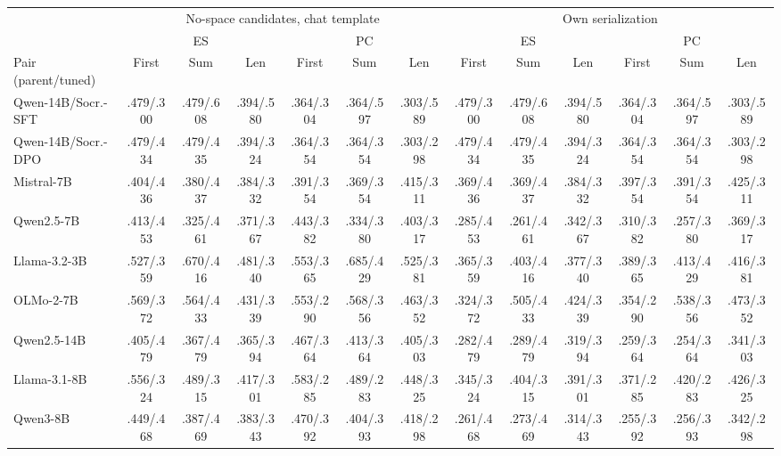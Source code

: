 \begin{table}[t]
\centering\scriptsize
\setlength{\tabcolsep}{2.0pt}
\begin{tabular}{@{}lccc@{\hspace{8pt}}ccc@{\hspace{8pt}}ccc@{\hspace{8pt}}ccc@{}}
\toprule
& \multicolumn{6}{c}{No-space candidates, chat template} & \multicolumn{6}{c}{Own serialization} \\
\cmidrule(lr){2-7}\cmidrule(l){8-13}
& \multicolumn{3}{c}{ES} & \multicolumn{3}{c}{PC} & \multicolumn{3}{c}{ES} & \multicolumn{3}{c}{PC} \\
\cmidrule(lr){2-4}\cmidrule(lr){5-7}\cmidrule(lr){8-10}\cmidrule(l){11-13}
Pair (parent/tuned) & First & Sum & Len & First & Sum & Len & First & Sum & Len & First & Sum & Len \\
\midrule
Qwen-14B/Socr.-SFT & .479/.300 & .479/.608 & .394/.580 & .364/.304 & .364/.597 & .303/.589 & .479/.300 & .479/.608 & .394/.580 & .364/.304 & .364/.597 & .303/.589 \\
Qwen-14B/Socr.-DPO & .479/.434 & .479/.435 & .394/.324 & .364/.354 & .364/.354 & .303/.298 & .479/.434 & .479/.435 & .394/.324 & .364/.354 & .364/.354 & .303/.298 \\
Mistral-7B & .404/.436 & .380/.437 & .384/.332 & .391/.354 & .369/.354 & .415/.311 & .369/.436 & .369/.437 & .384/.332 & .397/.354 & .391/.354 & .425/.311 \\
Qwen2.5-7B & .413/.453 & .325/.461 & .371/.367 & .443/.382 & .334/.380 & .403/.317 & .285/.453 & .261/.461 & .342/.367 & .310/.382 & .257/.380 & .369/.317 \\
Llama-3.2-3B & .527/.359 & .670/.416 & .481/.340 & .553/.365 & .685/.429 & .525/.381 & .365/.359 & .403/.416 & .377/.340 & .389/.365 & .413/.429 & .416/.381 \\
OLMo-2-7B & .569/.372 & .564/.433 & .431/.339 & .553/.290 & .568/.356 & .463/.352 & .324/.372 & .505/.433 & .424/.339 & .354/.290 & .538/.356 & .473/.352 \\
Qwen2.5-14B & .405/.479 & .367/.479 & .365/.394 & .467/.364 & .413/.364 & .405/.303 & .282/.479 & .289/.479 & .319/.394 & .259/.364 & .254/.364 & .341/.303 \\
Llama-3.1-8B & .556/.324 & .489/.315 & .417/.301 & .583/.285 & .489/.283 & .448/.325 & .345/.324 & .404/.315 & .391/.301 & .371/.285 & .420/.283 & .426/.325 \\
Qwen3-8B & .449/.468 & .387/.469 & .383/.343 & .470/.392 & .404/.393 & .418/.298 & .261/.468 & .273/.469 & .314/.343 & .255/.392 & .256/.393 & .342/.298 \\

\end{tabular}
\end{table}
